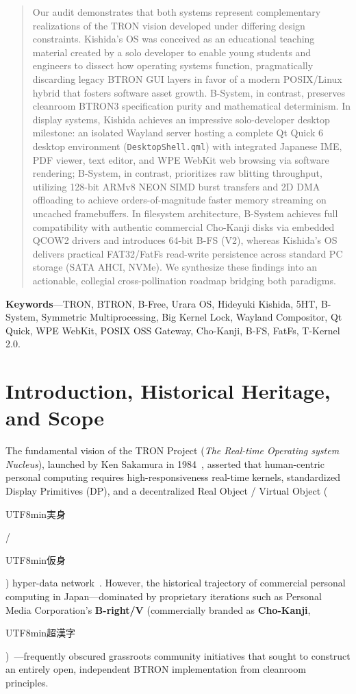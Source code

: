 \documentclass[10pt,journal,compsoc,twocolumn]{article}
\newcommand{\ja}[1]{\begin{CJK*}{UTF8}{min}#1\end{CJK*}}
\begin{document}
\begin{abstract}
Our audit demonstrates that both systems represent complementary realizations of the TRON vision developed under differing design constraints. Kishida's OS was conceived as an educational teaching material created by a solo developer to enable young students and engineers to dissect how operating systems function, pragmatically discarding legacy BTRON GUI layers in favor of a modern POSIX/Linux hybrid that fosters software asset growth. B-System, in contrast, preserves cleanroom BTRON3 specification purity and mathematical determinism. In display systems, Kishida achieves an impressive solo-developer desktop milestone: an isolated Wayland server hosting a complete Qt Quick 6 desktop environment (\texttt{DesktopShell.qml}) with integrated Japanese IME, PDF viewer, text editor, and WPE WebKit web browsing via software rendering; B-System, in contrast, prioritizes raw blitting throughput, utilizing 128-bit ARMv8 NEON SIMD burst transfers and 2D DMA offloading to achieve orders-of-magnitude faster memory streaming on uncached framebuffers. In filesystem architecture, B-System achieves full compatibility with authentic commercial Cho-Kanji disks via embedded QCOW2 drivers and introduces 64-bit B-FS (V2), whereas Kishida's OS delivers practical FAT32/FatFs read-write persistence across standard PC storage (SATA AHCI, NVMe). We synthesize these findings into an actionable, collegial cross-pollination roadmap bridging both paradigms.
\end{abstract}

\noindent\textbf{\small Keywords}---TRON, BTRON, B-Free, Urara OS, Hideyuki Kishida, 5HT, B-System, Symmetric Multiprocessing, Big Kernel Lock, Wayland Compositor, Qt Quick, WPE WebKit, POSIX OSS Gateway, Cho-Kanji, B-FS, FatFs, T-Kernel 2.0.

\section{Introduction, Historical Heritage, and Scope}
\label{sec:intro}

The fundamental vision of the TRON Project (\emph{The Real-time Operating system Nucleus}), launched by Ken Sakamura in 1984~\cite{sakamura1984tron}, asserted that human-centric personal computing requires high-responsiveness real-time kernels, standardized Display Primitives (DP), and a decentralized Real Object / Virtual Object (\ja{実身}/\ja{仮身}) hyper-data network~\cite{btron3spec}. However, the historical trajectory of commercial personal computing in Japan—dominated by proprietary iterations such as Personal Media Corporation's \textbf{B-right/V} (commercially branded as \textbf{Cho-Kanji}, \ja{超漢字})~\cite{chokanji1999}—frequently obscured grassroots community initiatives that sought to construct an entirely open, independent BTRON implementation from cleanroom principles.
\end{document}
